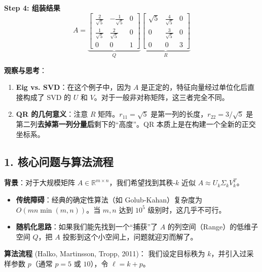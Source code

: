 \documentclass[11pt,a4paper]{ctexart}
\theoremstyle{definition}
\theoremstyle{remark}
\begin{document}
\textbf{Step 4: 组装结果}
\[
A = \underbrace{\begin{bmatrix} \frac{2}{\sqrt{5}} & -\frac{1}{\sqrt{5}} & 0 \\ \frac{1}{\sqrt{5}} & \frac{2}{\sqrt{5}} & 0 \\ 0 & 0 & 1 \end{bmatrix}}_{Q}
\underbrace{\begin{bmatrix} \sqrt{5} & \frac{4}{\sqrt{5}} & 0 \\ 0 & \frac{3}{\sqrt{5}} & 0 \\ 0 & 0 & 3 \end{bmatrix}}_{R}
\]

\hrulefill

\textbf{观察与思考}：
\begin{enumerate}
    \item \textbf{Eig vs. SVD}：在这个例子中，因为 $A$ 是正定的，特征向量经过单位化后直接构成了 SVD 的 $U$ 和 $V$。对于一般非对称矩阵，这三者完全不同。
    \item \textbf{QR 的几何意义}：注意 $R$ 矩阵。$r_{11}=\sqrt{5}$ 是第一列的长度，$r_{22}=3/\sqrt{5}$ 是第二列\textbf{去掉第一列分量后}剩下的“高度”。QR 本质上是在构建一个全新的正交坐标系。
\end{enumerate}




\subsection{1. 核心问题与算法流程}

\textbf{背景}：对于大规模矩阵 $A \in \mathbb{R}^{m \times n}$，我们希望找到其秩-$k$ 近似 $A \approx U_k \Sigma_k V_k^T$。
\begin{itemize}
    \item \textbf{传统障碍}：经典的确定性算法（如 Golub-Kahan）复杂度为 $O(mn \min(m,n))$。当 $m, n$ 达到 $10^5$ 级别时，这几乎不可行。
    \item \textbf{随机化思路}：如果我们能先找到一个“捕获”了 $A$ 的列空间（Range）的低维子空间 $Q$，把 $A$ 投影到这个小空间上，问题就迎刃而解了。
\end{itemize}

\textbf{算法流程} (Halko, Martinsson, Tropp, 2011)：
我们设定目标秩为 $k$，并引入过采样参数 $p$（通常 $p=5$ 或 $10$），令 $\ell = k + p$。
\end{document}
